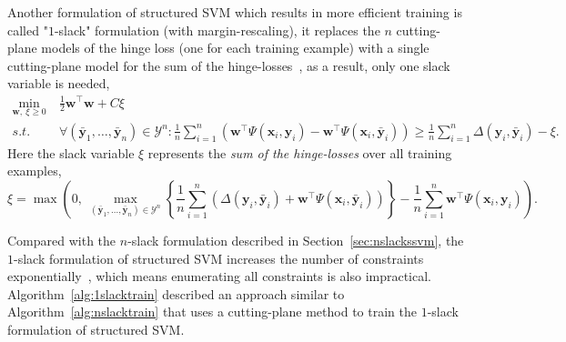 \documentclass[9pt]{extarticle}
\begin{document}
Another formulation of structured SVM which results in more efficient training is called "$1$-slack" formulation (with margin-rescaling),
it replaces the $n$ cutting-plane models of the hinge loss (one for each training example) with a single cutting-plane model for 
the sum of the hinge-losses~\cite{joachims2009cutting}, as a result, only one slack variable is needed,
\begin{equation}
\label{eq:1slackform}
\begin{aligned}
\min_{\mathbf{w}, ~\xi \ge 0} ~& \frac{1}{2} \mathbf{w}^\top \mathbf{w} + C \xi \\
s.t.~~ ~& \forall(\bar{\mathbf{y}}_1, \dots, \bar{\mathbf{y}}_n) \in \mathcal{Y}^n: 
          \frac{1}{n} \sum_{i=1}^n 
          \left( \mathbf{w}^\top \Psi(\mathbf{x}_i, \mathbf{y}_i) - \mathbf{w}^\top \Psi(\mathbf{x}_i, \bar{\mathbf{y}}_i) \right) \ge
          \frac{1}{n} \sum_{i=1}^n \Delta(\mathbf{y}_i, \bar{\mathbf{y}}_i) - \xi.
\end{aligned}
\end{equation}
Here the slack variable $\xi$ represents the \emph{sum of the hinge-losses} over all training examples,
\begin{equation*}
\xi = \max \left( 0,~ 
      \max_{(\bar{\mathbf{y}}_1, \dots, \bar{\mathbf{y}}_n) \in \mathcal{Y}^n} 
      \left\{ 
      \frac{1}{n} \sum_{i=1}^n \left( \Delta(\mathbf{y}_i, \bar{\mathbf{y}}_i) + \mathbf{w}^\top \Psi(\mathbf{x}_i, \bar{\mathbf{y}}_i) \right)
      \right\} - \frac{1}{n} \sum_{i=1}^n \mathbf{w}^\top \Psi(\mathbf{x}_i, \mathbf{y}_i)
      \right).
\end{equation*}


Compared with the $n$-slack formulation described in Section~\ref{sec:nslackssvm}, 
the $1$-slack formulation of structured SVM increases the number of constraints exponentially~\cite{joachims2009cutting},
which means enumerating all constraints is also impractical.
Algorithm~\ref{alg:1slacktrain} described an approach similar to Algorithm~\ref{alg:nslacktrain} that uses a cutting-plane method to 
train the $1$-slack formulation of structured SVM.
\end{document}

